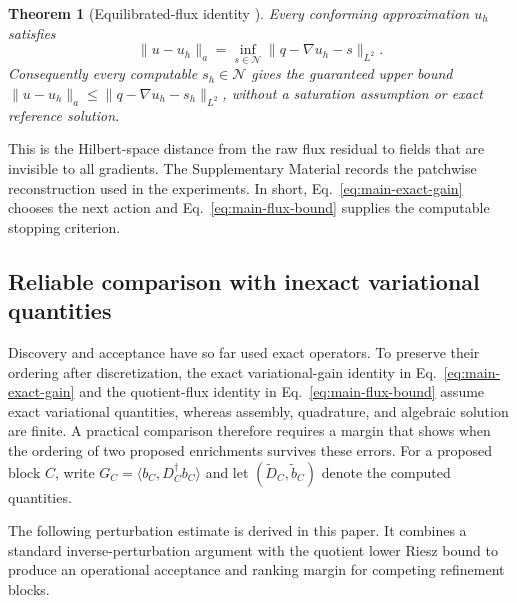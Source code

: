 \documentclass[11pt]{article}
\newtheorem{theorem}{Theorem}[section]
\numberwithin{algorithm}{section}
\theoremstyle{definition}\newtheorem{definition}[theorem]{Definition}
\theoremstyle{remark}\newtheorem{remark}[theorem]{Remark}
\begin{document}
\begin{theorem}[Equilibrated-flux identity
  {\cite{braessschoberl2008,ernvohralik2015}}]
\label{thm:main-flux-bound}
Every conforming approximation $u_h$ satisfies
\begin{equation}
 \|u-u_h\|_a
 =\inf_{s\in\mathcal N}\|q-\nabla u_h-s\|_{L^2}.
 \label{eq:main-flux-bound}
\end{equation}
Consequently every computable $s_h\in\mathcal N$ gives the guaranteed upper
bound $\|u-u_h\|_a\leq\|q-\nabla u_h-s_h\|_{L^2}$, without a saturation
assumption or exact reference solution.
\end{theorem}
This is the Hilbert-space distance from the raw flux residual to fields that
are invisible to all gradients.  The Supplementary Material records the
patchwise reconstruction used in the experiments.  In short,
Eq.~\eqref{eq:main-exact-gain} chooses the next action and
Eq.~\eqref{eq:main-flux-bound} supplies the computable stopping criterion.

\subsection{Reliable comparison with inexact variational quantities}
Discovery and acceptance have so far used exact operators.  To preserve their
ordering after discretization, the exact variational-gain identity in
Eq.~\eqref{eq:main-exact-gain} and the
quotient-flux identity in Eq.~\eqref{eq:main-flux-bound} assume exact
variational quantities, whereas assembly, quadrature, and algebraic solution
are finite.  A practical comparison therefore requires a margin that
shows when the ordering of two proposed enrichments survives these errors.
For a proposed block $C$, write
$G_C=\langle b_C,D_C^\dagger b_C\rangle$ and let
$(\widetilde D_C,\widetilde b_C)$ denote the computed quantities.

The following perturbation estimate is derived in this paper.  It combines a
standard inverse-perturbation argument with the quotient lower Riesz bound to
produce an operational acceptance and ranking margin for competing refinement
blocks.
\end{document}
